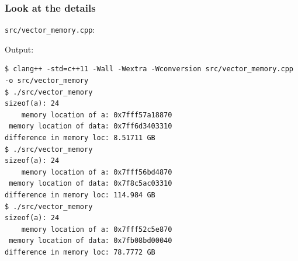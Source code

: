 \documentclass[12pt,letterpaper,twoside]{article}
\begin{document}
\hypertarget{look-at-the-details}{%
\subsubsection{Look at the details}\label{look-at-the-details}}

\texttt{src/vector\_memory.cpp}:

\begin{Shaded}
\begin{Highlighting}[]

  \NormalTok{ (}
\NormalTok{  \}}
  \NormalTok{ << }
\NormalTok{            << }\NormalTok{((}\NormalTok{ / }\NormalTok{ / } 
\NormalTok{            << }\NormalTok{ << }
   \NormalTok{;}
\NormalTok{\}}
\end{Highlighting}
\end{Shaded}

Output:

\begin{verbatim}
$ clang++ -std=c++11 -Wall -Wextra -Wconversion src/vector_memory.cpp -o src/vector_memory
$ ./src/vector_memory
sizeof(a): 24
    memory location of a: 0x7fff57a18870
 memory location of data: 0x7ff6d3403310
difference in memory loc: 8.51711 GB
$ ./src/vector_memory
sizeof(a): 24
    memory location of a: 0x7fff56bd4870
 memory location of data: 0x7f8c5ac03310
difference in memory loc: 114.984 GB
$ ./src/vector_memory
sizeof(a): 24
    memory location of a: 0x7fff52c5e870
 memory location of data: 0x7fb08bd00040
difference in memory loc: 78.7772 GB
\end{verbatim}
\end{document}
